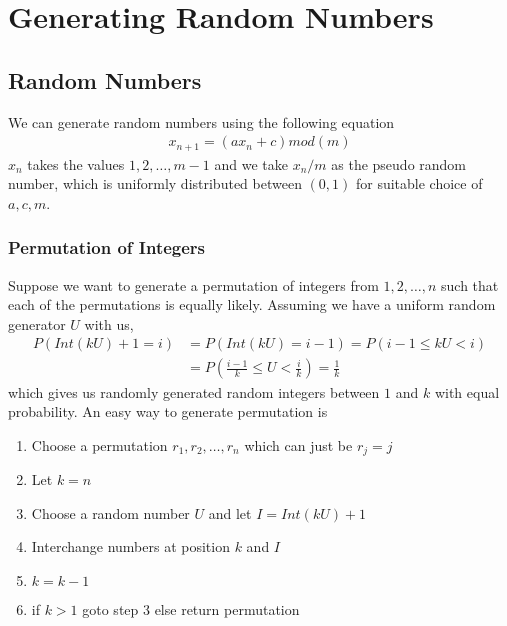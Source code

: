 \documentclass[../probability-notes.tex]{subfiles}
\begin{document}
    \chapter{Generating Random Numbers}
    \section{Random Numbers}
    We can generate random numbers using the following equation
    \begin{align*}
        x_{n+1} = (ax_{n} + c) mod(m)
    \end{align*}
    $x_{n}$ takes the values $1,2,\ldots, m-1$ and we take $x_{n}/m$ as the pseudo random number, which is uniformly distributed between $(0,1)$ for suitable choice of $a, c, m$.\newline

    
    \subsection{Permutation of Integers}
    Suppose we want to generate a permutation of integers from $1, 2, \ldots, n$ such that each of the permutations is equally likely. Assuming we have a uniform random generator $U$ with us, 
    \begin{align*}
        P(Int(kU) + 1 = i) &= P(Int(kU) = i-1) = P(i-1 \leq kU < i)\\
        &= P(\frac{i-1}{k} \leq U < \frac{i}{k}) = \frac{1}{k}
    \end{align*}
    which gives us randomly generated random integers between $1$ and $k$ with equal probability. An easy way to generate permutation is
    \begin{enumerate}
        \item Choose a permutation $r_{1}, r_{2}, \ldots, r_{n}$ which can just be $r_{j} = j$
        \item Let $k = n$
        \item Choose a random number $U$ and let $I = Int(kU) + 1$
        \item Interchange numbers at position $k$ and $I$
        \item $k = k-1$
        \item if $k > 1$ goto step 3 else return permutation
    \end{enumerate}
\end{document}
